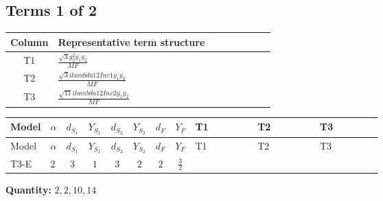 \documentclass[8pt]{article}
\begin{document}
\begin{landscape}
\subsection*{Terms 1 of 2}
\begin{center}
\begin{tabular}{@{}c >{\raggedright\arraybackslash}p{0.82\linewidth}@{}}
\toprule
Column & Representative term structure \\
\midrule
T1 & \(\displaystyle \frac{\sqrt{3} g_{2}^{2} \overline{y_{1}} \overline{y_{2}}}{MF}\) \\
\midrule
T2 & \(\displaystyle \frac{\sqrt{3} i lambda12Inv1 \overline{y_{1}} \overline{y_{2}}}{MF}\) \\
\midrule
T3 & \(\displaystyle \frac{\sqrt{11} i lambda12Inv2 \overline{y_{1}} \overline{y_{2}}}{MF}\) \\
\midrule
\bottomrule
\end{tabular}
\end{center}
\smallskip
\tiny
\begin{longtable}{@{}llcccccc >{\raggedright\arraybackslash}p{0.21\linewidth} >{\raggedright\arraybackslash}p{0.21\linewidth} >{\raggedright\arraybackslash}p{0.21\linewidth}@{}}
\toprule
Model & $\alpha$ & $d_{S_1}$ & $Y_{S_1}$ & $d_{S_2}$ & $Y_{S_2}$ & $d_F$ & $Y_F$ & T1 & T2 & T3 \\
\midrule
\endfirsthead
\toprule
Model & $\alpha$ & $d_{S_1}$ & $Y_{S_1}$ & $d_{S_2}$ & $Y_{S_2}$ & $d_F$ & $Y_F$ & T1 & T2 & T3 \\
\midrule
\endhead
T3-E & $2$ & $3$ & $1$ & $3$ & $2$ & $2$ & $\frac{3}{2}$ & \scriptsize\adjustbox{max width=\linewidth}{$\begin{gathered} - \frac{\sqrt{3} g_{2}^{2} \overline{y_{1}} \overline{y_{2}}}{6 MF}\end{gathered}$} & \scriptsize\adjustbox{max width=\linewidth}{$\begin{gathered} - \frac{\sqrt{3} i lambda12Inv1 \overline{y_{1}} \overline{y_{2}}}{6 MF}\end{gathered}$} & \scriptsize\adjustbox{max width=\linewidth}{$\begin{gathered} \frac{3 \sqrt{11} i lambda12Inv2 \overline{y_{1}} \overline{y_{2}}}{22 MF}\end{gathered}$} \\
\midrule
\bottomrule
\end{longtable}
\clearpage
\noindent\textbf{Quantity: }$\mathrm{2,2,10,14}$\par\smallskip

\end{landscape}
\end{document}
